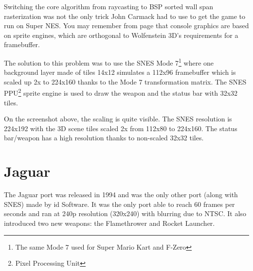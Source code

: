 \documentclass[book.tex]{subfiles}
\begin{document}
\par
Switching the core algorithm from raycasting to BSP sorted wall span rasterization was not the only trick John Carmack had to use to get the game to run on Super NES. You may remember from page \pageref{sprite_engine_ref} that console graphics are based on sprite engines, which are orthogonal to Wolfenstein 3D's requirements for a framebuffer.\\
\par The solution to this problem was to use the SNES Mode 7\footnote{The same Mode 7 used for Super Mario Kart and F-Zero} where one background layer made of tiles 14x12 simulates a 112x96 framebuffer which is scaled up 2x to 224x160 thanks to the Mode 7 transformation matrix. The SNES PPU\footnote{Pixel Processing Unit} sprite engine is used to draw the weapon and the status bar with 32x32 tiles.



\begin{figure}[H]
\centering
 
 \end{figure}
 \par
On the screenshot above, the scaling is quite visible. The SNES resolution is 224x192 with the 3D scene tiles scaled 2x from 112x80 to 224x160. The status bar/weapon has a high resolution thanks to non-scaled 32x32 tiles.









\section{Jaguar}
The Jaguar port was released in 1994 and was the only other port (along with SNES) made by id Software. It was the only port able to reach 60 frames per seconds and ran at 240p resolution (320x240) with blurring due to NTSC. It also introduced two new weapons: the Flamethrower and Rocket Launcher.\\
\par
\end{document}

